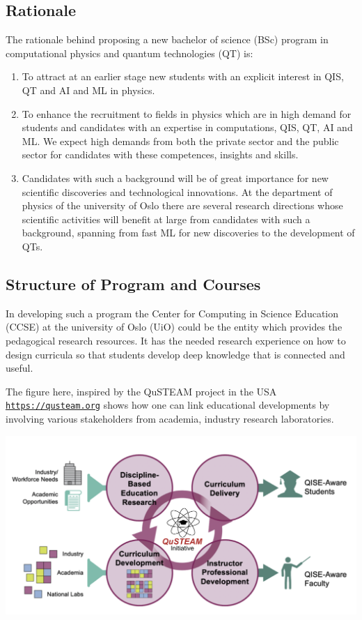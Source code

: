 \documentclass[%
oneside,                 %
final,                   %
10pt]{article}
\begin{document}
\subsection{Rationale}

The rationale behind proposing a new bachelor of science (BSc) program in computational physics and quantum technologies (QT) is:
\begin{enumerate}
\item To attract at an earlier stage new students with an explicit interest in QIS, QT and AI and ML in physics. 

\item To enhance the recruitment to fields in physics which are in high demand for students and candidates with an expertise in computations, QIS, QT, AI and ML. We expect high demands from both the private sector and the public sector for candidates with these competences, insights and skills.

\item Candidates with such a background will be of great importance for new scientific discoveries and technological innovations. At the department of physics of the university of Oslo there are several research directions whose scientific activities will benefit at large from candidates with such a background, spanning from fast ML for new discoveries to the development of QTs.   
\end{enumerate}

\noindent
\subsection{Structure of Program and Courses}

In developing such a program the Center for Computing in Science
Education (CCSE) at the university of Oslo (UiO) could be the entity
which provides the pedagogical research resources. It has the needed
research experience on how to design curricula so that students
develop deep knowledge that is connected and useful.

The figure here, inspired by the QuSTEAM project in the USA \href{{https://qusteam.org}}{\nolinkurl{https://qusteam.org}}
shows how one can link educational developments by involving various stakeholders from academia, industry research  laboratories. 

\vspace{6mm}

\centerline{\includegraphics[width=0.7\linewidth]{qusteam.png}}
\end{document}
